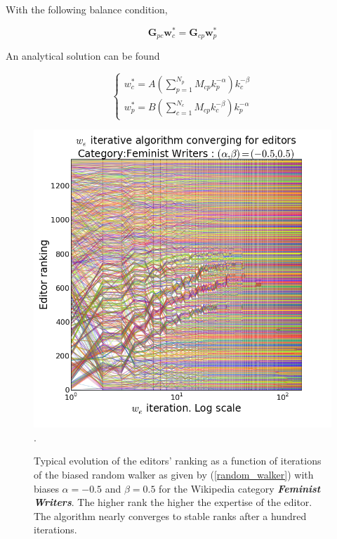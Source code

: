 With the following balance condition,

\begin{equation}
\mathbf{G}_{pc} \mathbf{w}^*_c = \mathbf{G}_{cp} \mathbf{w}^*_p
\end{equation}

An analytical solution can be found \cite{caldarelli}

\begin{equation}
\begin{cases}
 w^*_c = A(\sum^{N_p}_{p=1} M_{cp}k_p^{-\alpha})k_c^{-\beta} \\
w^*_p = B(\sum^{N_c}_{c=1} M_{cp}k_c^{-\beta})k_p^{-\alpha}
\end{cases}
\end{equation}



\begin{figure}[!t]
\centering
\includegraphics[width=0.9\columnwidth]{Figures/fem_editors_iter_converge.png}.
\caption{Typical evolution of the editors' ranking as a function of iterations of the biased random walker as  given by (\ref{random_walker}) with biases $\alpha = -0.5$ and $\beta = 0.5$ for the Wikipedia category \textit{\textbf{ Feminist Writers}}. The higher rank the higher the expertise of the editor. The algorithm nearly converges to stable ranks after a hundred iterations.}
\label{fig:convergence}
\end{figure}

